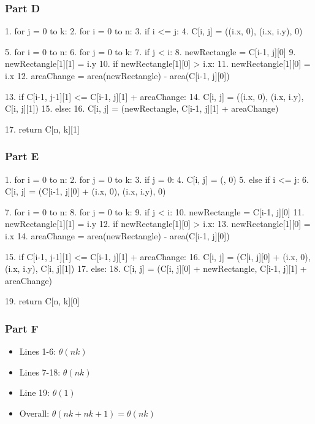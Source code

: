 \documentclass[12pt]{article}
\begin{document}
\subsubsection*{Part D}
\begin{verbnobox}[\scriptsize]
1.  for j = 0 to k:
2.    for i = 0 to n:
3.      if i <= j:
4.        C[i, j] = ({(i.x, 0), (i.x, i.y)}, 0)

5.  for i = 0 to n:
6.    for j = 0 to k:
7.      if j < i:
8.        newRectangle = C[i-1, j][0]
9.        newRectangle[1][1] = i.y
10.       if newRectangle[1][0] > i.x:
11.         newRectangle[1][0] = i.x
12.       areaChange = area(newRectangle) - area(C[i-1, j][0])

13.       if C[i-1, j-1][1] <= C[i-1, j][1] + areaChange:
14.         C[i, j] = ({(i.x, 0), (i.x, i.y)}, C[i, j][1])
15.       else:
16.         C[i, j] = (newRectangle, C[i-1, j][1] + areaChange)

17. return C[n, k][1]
\end{verbnobox}

\subsubsection*{Part E}
\begin{verbnobox}[\scriptsize]
1.  for i = 0 to n:
2.    for j = 0 to k:
3.      if j = 0:
4.        C[i, j] = ({}, 0)
5.      else if i <= j:
6.        C[i, j] = (C[i-1, j][0] + {(i.x, 0), (i.x, i.y)}, 0)

7.  for i = 0 to n:
8.    for j = 0 to k:
9.      if j < i:
10.       newRectangle = C[i-1, j][0]
11.       newRectangle[1][1] = i.y
12.       if newRectangle[1][0] > i.x:
13.         newRectangle[1][0] = i.x
14.       areaChange = area(newRectangle) - area(C[i-1, j][0])

15.       if C[i-1, j-1][1] <= C[i-1, j][1] + areaChange:
16.         C[i, j] = (C[i, j][0] + {(i.x, 0), (i.x, i.y)}, C[i, j][1])
17.       else:
18.         C[i, j] = (C[i, j][0] + newRectangle, C[i-1, j][1] + areaChange)

19. return C[n, k][0]
\end{verbnobox}

\subsubsection*{Part F}
\begin{itemize}
\item Lines 1-6: $\theta(nk)$
\item Lines 7-18: $\theta(nk)$
\item Line 19: $\theta(1)$
\item Overall: $\theta(nk + nk + 1) = \theta(nk)$
\end{itemize}
\end{document}
